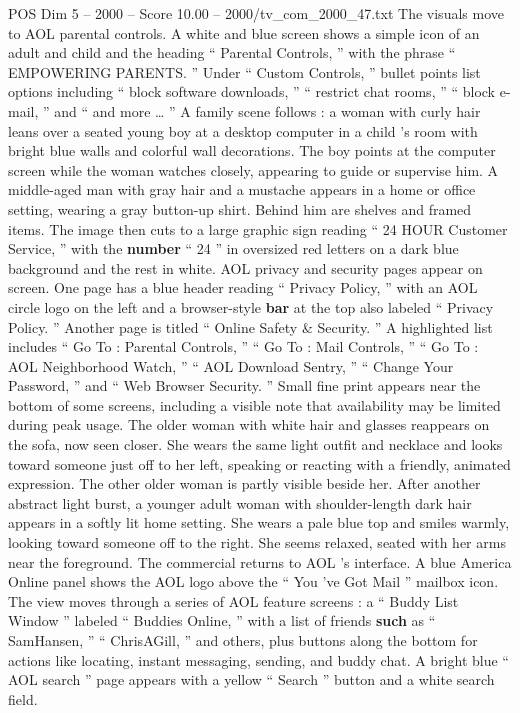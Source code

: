 \begin{textsample}{POS Dim 5 – 2000 – Score 10.00 – 2000/tv\_com\_2000\_47.txt}
The visuals move to AOL parental controls.
A white and blue screen shows a simple icon of an adult and child and the heading “ Parental Controls, ” with the phrase “ EMPOWERING PARENTS. ” Under “ Custom Controls, ” bullet points list options including “ block software downloads, ” “ restrict chat rooms, ” “ block e-mail, ” and “ and more … ” A family scene follows : a woman with curly hair leans over a seated young boy at a desktop computer in a child ’s room with bright blue walls and colorful wall decorations.
The boy points at the computer screen while the woman watches closely, appearing to guide or supervise him.
A middle-aged man with gray hair and a mustache appears in a home or office setting, wearing a gray button-up shirt.
Behind him are shelves and framed items.
The image then cuts to a large graphic sign reading “ 24 HOUR Customer Service, ” with the \textbf{number} “ 24 ” in oversized red letters on a dark blue background and the rest in white.
AOL privacy and security pages appear on screen.
One page has a blue header reading “ Privacy Policy, ” with an AOL circle logo on the left and a browser-style \textbf{bar} at the top also labeled “ Privacy Policy. ” Another page is titled “ Online Safety \& Security. ” A highlighted list includes “ Go To : Parental Controls, ” “ Go To : Mail Controls, ” “ Go To : AOL Neighborhood Watch, ” “ AOL Download Sentry, ” “ Change Your Password, ” and “ Web Browser Security. ” Small fine print appears near the bottom of some screens, including a visible note that availability may be limited during peak usage.
The older woman with white hair and glasses reappears on the sofa, now seen closer.
She wears the same light outfit and necklace and looks toward someone just off to her left, speaking or reacting with a friendly, animated expression.
The other older woman is partly visible beside her.
After another abstract light burst, a younger adult woman with shoulder-length dark hair appears in a softly lit home setting.
She wears a pale blue top and smiles warmly, looking toward someone off to the right.
She seems relaxed, seated with her arms near the foreground.
The commercial returns to AOL ’s interface.
A blue America Online panel shows the AOL logo above the “ You ’ve Got Mail ” mailbox icon.
The view moves through a series of AOL feature screens : a “ Buddy List Window ” labeled “ Buddies Online, ” with a list of friends \textbf{such} as “ SamHansen, ” “ ChrisAGill, ” and others, plus buttons along the bottom for actions like locating, instant messaging, sending, and buddy chat.
A bright blue “ AOL search ” page appears with a yellow “ Search ” button and a white search field.

\end{textsample}
